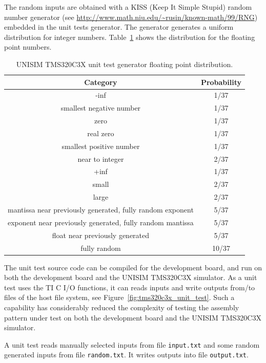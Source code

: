 The random inputs are obtained with a KISS (Keep It Simple Stupid) random number generator (see \url{http://www.math.niu.edu/\~rusin/known-math/99/RNG}) embedded in the unit tests generator. The generator generates a uniform distribution for integer numbers. Table~\ref{table:tms320c3x_unit_test_float_distribution} shows the distribution for the floating point numbers.

\begin{table}[p]
\begin{center}
\begin{tabular}{|c|c|}
\hline
\textbf{Category} & \textbf{Probability}\\
\hline
-inf & 1/37\\
\hline
smallest negative number & 1/37\\
\hline
zero & 1/37\\
\hline
real zero & 1/37\\
\hline
smallest positive number & 1/37\\
\hline
near to integer & 2/37\\
\hline
+inf & 1/37\\
\hline
small & 2/37\\
\hline
large & 2/37\\ 
\hline
mantissa near previously generated, fully random exponent & 5/37\\
\hline
exponent near previously generated, fully random mantissa & 5/37\\
\hline
float near previously generated & 5/37\\
\hline
fully random & 10/37\\
\hline
\end{tabular}
\caption{UNISIM TMS320C3X unit test generator floating point distribution.}
\label{table:tms320c3x_unit_test_float_distribution}
\end{center}
\end{table}

The unit test source code can be compiled for the development board, and run on both the development board and the UNISIM TMS320C3X simulator.
As a unit test uses the TI C I/O functions, it can reads inputs and write outputs from/to files of the host file system, see Figure~\ref{fig:tms320c3x_unit_test}. Such a capability has considerably reduced the complexity of testing the assembly pattern under test on both the development board and the UNISIM TMS320C3X simulator.

A unit test reads manually selected inputs from file \texttt{input.txt} and some random generated inputs from file \texttt{random.txt}. It writes outputs into file \texttt{output.txt}.

